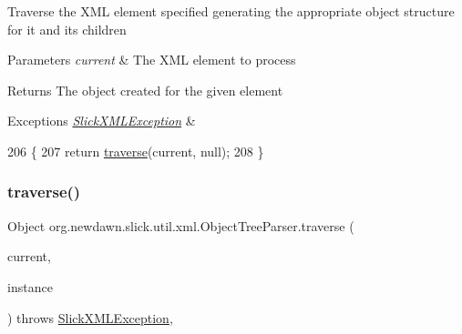 Traverse the X\+ML element specified generating the appropriate object structure for it and it\textquotesingle{}s children


\begin{DoxyParams}{Parameters}
{\em current} & The X\+ML element to process \\
\hline
\end{DoxyParams}
\begin{DoxyReturn}{Returns}
The object created for the given element 
\end{DoxyReturn}

\begin{DoxyExceptions}{Exceptions}
{\em \mbox{\hyperlink{classorg_1_1newdawn_1_1slick_1_1util_1_1xml_1_1_slick_x_m_l_exception}{Slick\+X\+M\+L\+Exception}}} & \\
\hline
\end{DoxyExceptions}

\begin{DoxyCode}
206                                                                          \{
207         \textcolor{keywordflow}{return} \mbox{\hyperlink{classorg_1_1newdawn_1_1slick_1_1util_1_1xml_1_1_object_tree_parser_a1adc20e7ba6879b553d681e59f182126}{traverse}}(current, null);
208     \}
\end{DoxyCode}
\mbox{\label{classorg_1_1newdawn_1_1slick_1_1util_1_1xml_1_1_object_tree_parser_aae6a4de36679329fe38f61bfbd4b9ad2}} 
\subsubsection{\texorpdfstring{traverse()}{traverse()}\hspace{0.1cm}{\footnotesize\ttfamily [2/2]}}
{\footnotesize\ttfamily Object org.\+newdawn.\+slick.\+util.\+xml.\+Object\+Tree\+Parser.\+traverse (\begin{DoxyParamCaption}\item[{\mbox{\hyperlink{classorg_1_1newdawn_1_1slick_1_1util_1_1xml_1_1_x_m_l_element}{X\+M\+L\+Element}}}]{current,  }\item[{Object}]{instance }\end{DoxyParamCaption}) throws \mbox{\hyperlink{classorg_1_1newdawn_1_1slick_1_1util_1_1xml_1_1_slick_x_m_l_exception}{Slick\+X\+M\+L\+Exception}}\hspace{0.3cm}{\ttfamily [inline]}, {\ttfamily [private]}}

